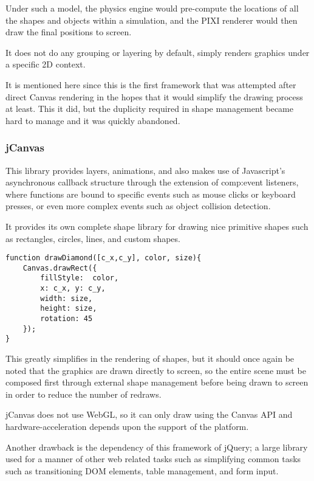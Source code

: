 Under such a model, the physics engine would pre-compute the locations of all the shapes and objects within a simulation, and the PIXI renderer would then draw the final positions to screen. 

It does not do any grouping or layering  by default, simply renders graphics under a specific 2D context. 

It is mentioned here since this is the first framework that was attempted after direct Canvas rendering in the hopes that it would simplify the drawing process at least. This it did, but the duplicity required in shape management became hard to manage and it was quickly abandoned.


\subsubsection{jCanvas}

This library provides layers, animations, and also makes use of Javascript's asynchronous callback structure through the extension of \gls{comp:event listeners}, where functions are bound to specific events such as mouse clicks or keyboard presses, or even more complex events such as object collision detection\citep{jcanvas}.

It provides its own complete shape library for drawing nice primitive shapes such as rectangles, circles, lines, and custom shapes.


\begingroup
\begin{spacing}{1}
\begin{lstlisting}[label=code:jCanvasapi]
function drawDiamond([c_x,c_y], color, size){
	Canvas.drawRect({
		fillStyle:  color,
		x: c_x,	y: c_y,
		width: size,
		height: size,
		rotation: 45
	});
}
\end{lstlisting}
\vspace{-10pt}
\end{spacing}
\endgroup

This greatly simplifies in the rendering of shapes, but it should once again be noted that the graphics are drawn directly to screen, so the entire scene must be composed first through external shape management before being drawn to screen in order to reduce the number of redraws.

jCanvas does not use WebGL, so it can only draw using the Canvas API and hardware-acceleration depends upon the support of the platform.

Another drawback is the dependency of this framework of jQuery; a large library used for a manner of other web related tasks such as simplifying common tasks such as transitioning DOM elements, table management, and form input.

